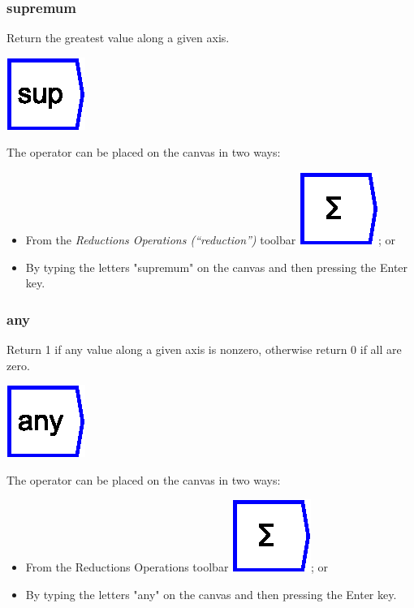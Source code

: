 \subsubsection{supremum}

\label{Operation:supremum} Return the greatest value along a given
axis.

\includegraphics{images/supremum}

The operator can be placed on the canvas in two ways:
\begin{itemize}
\item From the \emph{Reductions Operations (``reduction'')} toolbar \includegraphics{images/sum};
or 
\item By typing the letters "supremum" on the canvas and then pressing
the Enter key.
\end{itemize}

\subsubsection{any}

\label{Operation:any} Return 1 if any value along a given axis is
nonzero, otherwise return 0 if all are zero.

\includegraphics{images/any}

The operator can be placed on the canvas in two ways:
\begin{itemize}
\item From the Reductions Operations toolbar \includegraphics{images/sum};
or 
\item By typing the letters "any" on the canvas and then pressing the
Enter key.
\end{itemize}

